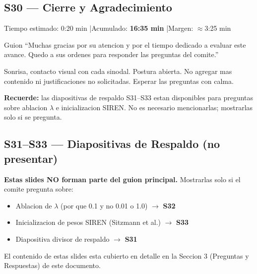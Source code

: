 \subsection{S30 --- Cierre y Agradecimiento}

\begin{timebox}
Tiempo estimado: 0:20 min \quad|\quad Acumulado: \textbf{16:35 min} \quad|\quad Margen: $\approx$3:25 min
\end{timebox}
\vspace{4pt}

\begin{slidebox}{Guion}
``Muchas gracias por su atencion y por el tiempo dedicado a evaluar este avance.
Quedo a sus ordenes para responder las preguntas del comite.''
\end{slidebox}
\vspace{4pt}

\begin{tipbox}
Sonrisa, contacto visual con cada sinodal. Postura abierta. No agregar
mas contenido ni justificaciones no solicitadas. Esperar las preguntas
con calma.

\textbf{Recuerde:} las diapositivas de respaldo S31--S33 estan disponibles
para preguntas sobre ablacion $\lambda$ e inicializacion SIREN. No es necesario
mencionarlas; mostrarlas solo si se pregunta.
\end{tipbox}

\vspace{8pt}

\subsection{S31--S33 --- Diapositivas de Respaldo (no presentar)}

\begin{warningbox}
\textbf{Estas slides NO forman parte del guion principal.}
Mostrarlas solo si el comite pregunta sobre:
\begin{itemize}
  \item Ablacion de $\lambda$ (por que 0.1 y no 0.01 o 1.0) $\to$ \textbf{S32}
  \item Inicializacion de pesos SIREN (Sitzmann et al.) $\to$ \textbf{S33}
  \item Diapositiva divisor de respaldo $\to$ \textbf{S31}
\end{itemize}
El contenido de estas slides esta cubierto en detalle en la Seccion 3
(Preguntas y Respuestas) de este documento.
\end{warningbox}

